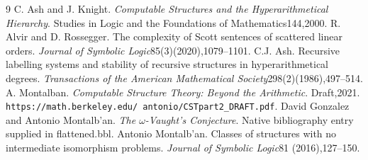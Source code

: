 \documentclass[10pt,a4paper]{amsart}
\begin{document}
\begin{thebibliography}{9}
 C. Ash and J. Knight. \emph{Computable Structures and the Hyperarithmetical Hierarchy}. Studies in Logic and the Foundations of Mathematics144,2000.
 R. Alvir and D. Rossegger. The complexity of Scott sentences of scattered linear orders. \emph{Journal of Symbolic Logic}85(3)(2020),1079--1101.
 C.J. Ash. Recursive labelling systems and stability of recursive structures in hyperarithmetical degrees. \emph{Transactions of the American Mathematical Society}298(2)(1986),497--514.
 A. Montalban. \emph{Computable Structure Theory: Beyond the Arithmetic}. Draft,2021. \texttt{https://math.berkeley.edu/\string~antonio/CSTpart2\_DRAFT.pdf}.
 David Gonzalez and Antonio Montalb'an. \emph{The $\omega$-Vaught's Conjecture}. Native bibliography entry supplied in flattened.bbl.
 Antonio Montalb'an. Classes of structures with no intermediate isomorphism problems. \emph{Journal of Symbolic Logic}81 (2016),127--150.
\end{thebibliography}
\end{document}
